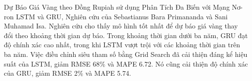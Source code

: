 Dự Báo Giá Vàng theo Đồng Rupiah sử dụng Phân Tích Đa Biến với Mạng Nơ-ron LSTM và GRU\cite{article4}, Nghiên cứu của Sebastianus Bara Primananda và Sani Muhamad Isa. Nghiên cứu cho thấy mô hình tốt nhất để dự báo giá vàng thay đổi theo khoảng thời gian dự báo. Trong khoảng thời gian dưới ba năm, GRU đạt độ chính xác cao nhất, trong khi LSTM vượt trội với các khoảng thời gian trên ba năm. Việc điều chỉnh siêu tham số bằng Grid Search đã cải thiện đáng kể hiệu suất của LSTM, giảm RMSE 68\% và MAPE 6.72. Nó cũng cải thiện độ chính xác của GRU, giảm RMSE 2\% và MAPE 5.74. 